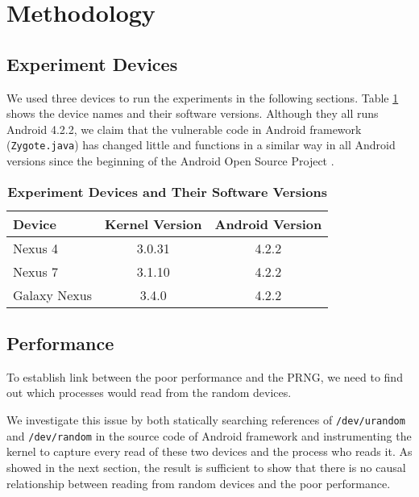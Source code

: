 \section{Methodology}

\subsection{Experiment Devices}

We used three devices to run the experiments in the following sections. Table \ref{tbldevice} shows the device names and their software versions. Although they all runs Android 4.2.2, we claim that the vulnerable code in Android framework (\verb|Zygote.java|) has changed little and functions in a similar way in all Android versions since the beginning of the Android Open Source Project \cite{zygotejava}. 

\begin{table}
\begin{center}
\begin{tabular}{|l|c|c|}
\hline
\bf Device & \bf Kernel Version & \bf Android Version \\
\hline
Nexus 4 & 3.0.31 & 4.2.2 \\
\hline
Nexus 7 & 3.1.10 & 4.2.2 \\
\hline
Galaxy Nexus & 3.4.0 & 4.2.2 \\
\hline

\end{tabular}
\end{center}
\caption{{\bf Experiment Devices and Their Software Versions} }
\label{tbldevice}
\end{table}


\subsection{Performance}

To establish link between the poor performance and the PRNG, we need to find out which processes would read from the random devices.

We investigate this issue by both statically searching references of \verb|/dev/urandom| and \verb|/dev/random| in the source code of Android framework and instrumenting the kernel to capture every read of these two devices and the process who reads it. As showed in the next section, the result is sufficient to show that there is no causal relationship between reading from random devices and the poor performance.

